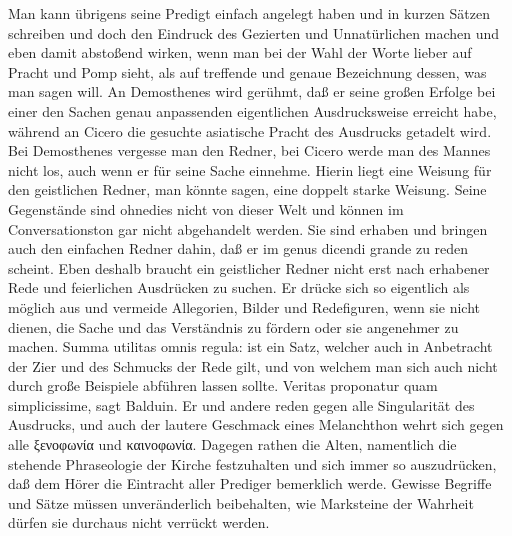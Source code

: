 Man kann übrigens seine Predigt einfach angelegt haben und in kurzen Sätzen schreiben und doch den Eindruck des Gezierten und Unnatürlichen machen und eben damit abstoßend wirken, wenn man bei der Wahl der Worte lieber auf Pracht und Pomp sieht, als auf treffende und genaue Bezeichnung dessen, was man sagen will. An Demosthenes wird gerühmt, daß er seine großen Erfolge bei einer den Sachen genau anpassenden eigentlichen Ausdrucksweise erreicht habe, während an Cicero die gesuchte asiatische Pracht des Ausdrucks getadelt wird. Bei Demosthenes vergesse man den Redner, bei Cicero werde man des Mannes nicht los, auch wenn er für seine Sache einnehme. Hierin liegt eine Weisung für den geistlichen Redner, man könnte sagen, eine doppelt starke Weisung.
Seine Gegenstände sind ohnedies nicht von dieser Welt und können im Conversationston gar nicht abgehandelt werden. Sie sind erhaben und bringen auch den einfachen Redner dahin, daß er im genus dicendi grande zu reden scheint. Eben deshalb braucht ein geistlicher Redner nicht erst nach erhabener Rede und feierlichen Ausdrücken zu suchen. Er drücke sich so eigentlich als möglich aus und vermeide Allegorien, Bilder und Redefiguren, wenn sie nicht dienen, die Sache und das Verständnis zu fördern oder sie angenehmer zu machen. Summa utilitas omnis regula: ist ein Satz, welcher auch in Anbetracht der Zier und des Schmucks der Rede gilt, und von welchem man sich auch nicht durch große Beispiele abführen lassen sollte. Veritas proponatur quam simplicissime, sagt Balduin. Er und andere reden gegen alle Singularität des Ausdrucks, und auch der lautere Geschmack eines Melanchthon wehrt sich gegen alle ξενοφωνία und καινοφωνία. Dagegen rathen die Alten, namentlich die stehende Phraseologie der Kirche festzuhalten und sich immer so auszudrücken, daß dem Hörer die Eintracht aller Prediger bemerklich werde. Gewisse Begriffe und Sätze müssen unveränderlich beibehalten, wie Marksteine der Wahrheit dürfen sie durchaus nicht verrückt werden.

